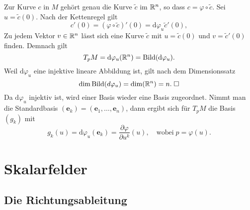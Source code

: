 \noindent{}
Zur Kurve $c$ in $M$ gehört genau die Kurve $\tilde c$ im $\mathbb R^n$, so
dass $c=\varphi\circ\tilde c$. Sei $u=\tilde c(0)$. Nach der
Kettenregel gilt%
\begin{equation}
c'(0) = (\varphi\circ\tilde c)'(0) = \mathrm d\varphi_u\tilde c'(0),
\end{equation}
Zu jedem Vektor $v\in\mathbb R^n$ lässt sich eine Kurve $\tilde c$
mit $u=\tilde c(0)$ und $v=\tilde c'(0)$ finden. Demnach gilt
\begin{equation}
T_p M = \mathrm d\varphi_u(\mathbb R^n) = \operatorname{Bild}(\mathrm d\varphi_u).
\end{equation}
Weil $\mathrm d\varphi_u$ eine injektive lineare Abbildung ist,
gilt nach dem Dimensionssatz%
\begin{equation}
\dim\operatorname{Bild}(d\varphi_u) = \dim(\mathbb R^n) = n.\;\Box
\end{equation}
Da $\mathrm d\varphi_u$ injektiv ist, wird einer Basis wieder eine
Basis zugeordnet. Nimmt man die Standardbasis
$(\mathbf e_k)=(\mathbf e_1,\ldots,\mathbf e_n)$, dann ergibt
sich für $T_p M$ die Basis $(g_k)$ mit
\begin{equation}
g_k(u) = \mathrm d\varphi_u(\mathbf e_k)
= \frac{\partial\varphi}{\partial u^k}(u),\quad\text{wobei}\; p=\varphi(u).
\end{equation}


\section{Skalarfelder}

\subsection{Die Richtungsableitung}

